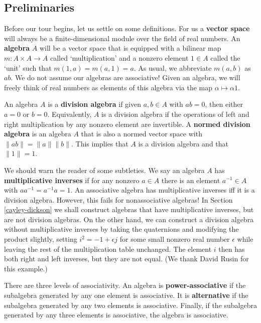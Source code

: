 \documentclass[12pt]{article}
\newcommand{\maps}{\colon}
\begin{document}
\subsection{Preliminaries} \label{preliminaries}

Before our tour begins, let us settle on some definitions.  For us a
{\bf vector space} will always be a finite-dimensional module over the
field of real numbers.  An {\bf algebra} $A$ will be a vector space that
is equipped with a bilinear map $m \maps A \times A \to A$ called
`multiplication' and a nonzero element $1 \in A$ called the `unit' such
that $m(1,a) = m(a,1) = a$.  As usual, we abbreviate $m(a,b)$ as $ab$.
We do not assume our algebras are associative!  Given an algebra, we
will freely think of real numbers as elements of this algebra via the
map $\alpha \mapsto \alpha 1$.
   
An algebra $A$ is a {\bf division algebra} if given $a,b \in A$ with $ab
= 0$, then either $a = 0$ or $b = 0$.  Equivalently, $A$ is a division
algebra if the operations of left and right multiplication by any
nonzero element are invertible.  A {\bf normed division algebra} is an
algebra $A$ that is also a normed vector space with $\|ab\| = \|a\|
\|b\|$.  This implies that $A$ is a division algebra and that $\|1\| =
1$.

We should warn the reader of some subtleties.  We say an algebra $A$ has
{\bf multiplicative inverses} if for any nonzero $a \in A$ there is an
element $a^{-1} \in A$ with $aa^{-1} = a^{-1}a = 1$.  An associative
algebra has multiplicative inverses iff it is a division
algebra.  However, this fails for nonassociative algebras!  In Section
\ref{cayley-dickson} we shall construct algebras that have
multiplicative inverses, but are not division algebras.  On the other
hand, we can construct a division algebra without multiplicative
inverses by taking the quaternions and modifying the product slightly,
setting $i^2 = -1 + \epsilon j$ for some small nonzero real number
$\epsilon$ while leaving the rest of the multiplication table unchanged.
The element $i$ then has both right and left inverses, but they are not
equal.  (We thank David Rusin for this example.)
   
There are three levels of associativity.  An algebra is {\bf   
power-associative} if the subalgebra generated by any one element is   
associative.  It is {\bf alternative} if the subalgebra generated by any   
two elements is associative.  Finally, if the subalgebra generated by any    
three elements is associative, the algebra is associative.     
   
\end{document}
